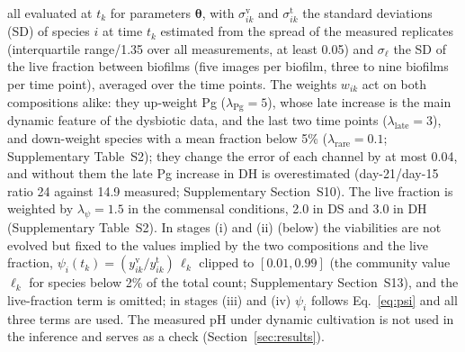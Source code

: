 \documentclass[preprint,12pt]{elsarticle}
\newcommand{\btheta}{\boldsymbol{\theta}}
\begin{document}
all evaluated at $t_k$ for parameters $\btheta$, with $\sigma^{\mathrm{v}}_{ik}$ and $\sigma^{\mathrm{t}}_{ik}$ the standard deviations (SD) of species $i$ at time $t_k$ estimated from the spread of the measured replicates (interquartile range/1.35 over all measurements, at least 0.05) and $\sigma_\ell$ the SD of the live fraction between biofilms (five images per biofilm, three to nine biofilms per time point), averaged over the time points.
The weights $w_{ik}$ act on both compositions alike: they up-weight Pg ($\lambda_{\mathrm{Pg}}=5$), whose late increase is the main dynamic feature of the dysbiotic data, and the last two time points ($\lambda_{\mathrm{late}}=3$), and down-weight species with a mean fraction below 5\% ($\lambda_{\mathrm{rare}}=0.1$; Supplementary Table~S2); they change the error of each channel by at most 0.04, and without them the late Pg increase in DH is overestimated (day-21/day-15 ratio 24 against 14.9 measured; Supplementary Section~S10).
The live fraction is weighted by $\lambda_\psi=1.5$ in the commensal conditions, 2.0 in DS and 3.0 in DH (Supplementary Table~S2).
In stages (i) and (ii) (below) the viabilities are not evolved but fixed to the values implied by the two compositions and the live fraction, $\psi_i(t_k)=(y^{\mathrm{v}}_{ik}/y^{\mathrm{t}}_{ik})\,\ell_k$ clipped to $[0.01,0.99]$ (the community value $\ell_k$ for species below 2\% of the total count; Supplementary Section~S13), and the live-fraction term is omitted; in stages (iii) and (iv) $\psi_i$ follows Eq.~\eqref{eq:psi} and all three terms are used.
The measured pH under dynamic cultivation is not used in the inference and serves as a check (Section~\ref{sec:results}).
\end{document}
